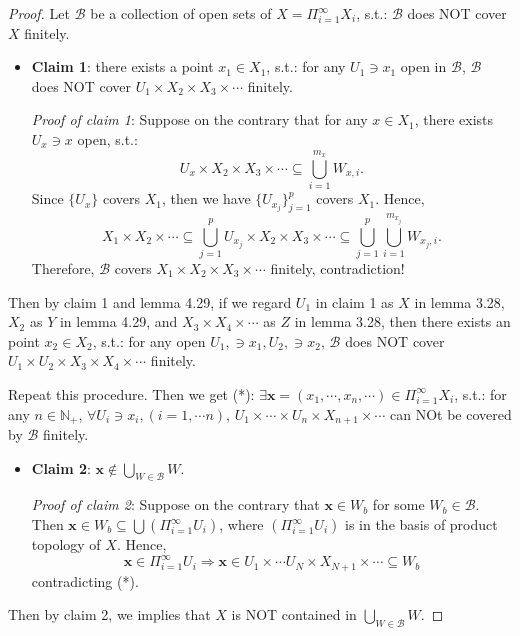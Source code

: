 \begin{proof}
    Let $\mathcal{B}$ be a collection of open sets of $X = \Pi_{i=1}^\infty X_i$, s.t.: $\mathcal{B}$ does NOT cover $X$ finitely.
    \begin{itemize}
        \item \textbf{Claim 1}: there exists a point $x_1 \in X_1$, s.t.: for any $U_1 \ni x_1$ open in $\mathcal{B}$, $\mathcal{B}$ does NOT cover $U_1 \times X_2 \times X_3 \times \cdots$ finitely.

        \textit{Proof of claim 1}: Suppose on the contrary that for any $x \in X_1$, there exists $U_x \ni x$ open, s.t.:
        $$U_x \times X_2 \times X_3 \times \cdots \subseteq \bigcup_{i=1}^{m_x} W_{x,i}.$$
        Since $\{ U_x \}$ covers $X_1$, then we have $\{ U_{x_j}\}_{j=1}^{p}$ covers $X_1$. Hence,
        $$X_1 \times X_2 \times \cdots \subseteq \bigcup_{j=1}^p U_{x_j} \times X_2 \times X_3 \times \cdots \subseteq \bigcup_{j=1}^p \bigcup_{i=1}^{m_{x_j}} W_{x_j ,i}.$$
        Therefore, $\mathcal{B}$ covers $X_1 \times X_2 \times X_3 \times \cdots$ finitely, contradiction!
    \end{itemize}
    Then by claim 1 and lemma 4.29, if we regard $U_1$ in claim 1 as $X$ in lemma 3.28, $X_2$ as $Y$ in lemma 4.29, and $X_3 \times X_4 \times \cdots$ as $Z$ in lemma 3.28, then there exists an point $x_2 \in X_2$, s.t.: for any open $U_1, \ni x_1,U_2,\ni x_2$, $\mathcal{B}$ does NOT cover $U_1 \times U_2 \times X_3 \times X_4 \times \cdots$ finitely.

    Repeat this procedure. Then we get (*): $\exists \mathbf{x} = (x_1, \cdots, x_n,\cdots) \in \Pi_{i=1}^\infty X_i$, s.t.: for any $n \in \mathbb{N}_+$, $\forall U_i \ni x_i,(i=1,\cdots n)$, $U_1 \times \cdots \times U_n \times X_{n+1} \times \cdots$ can NOt be covered by $\mathcal{B}$ finitely.
    \begin{itemize}
        \item \textbf{Claim 2}: $\mathbf{x} \notin \bigcup_{W \in \mathcal{B}}W$.

        \textit{Proof of claim 2}: Suppose on the contrary that $\mathbf{x} \in W_b$ for some $W_b \in \mathcal{B}$. Then $\mathbf{x} \in W_b \subseteq \bigcup (\Pi_{i=1}^\infty U_i)$, where $(\Pi_{i=1}^\infty U_i)$ is in the basis of product topology of $X$. Hence, 
        $$\mathbf{x} \in \Pi_{i=1}^\infty U_i \Rightarrow \mathbf{x} \in U_1 \times \cdots U_N \times X_{N+1} \times \cdots \subseteq W_b$$
        contradicting (*).
    \end{itemize}
    Then by claim 2, we implies that $X$ is NOT contained in $\bigcup_{W \in \mathcal{B}} W$.
\end{proof}

